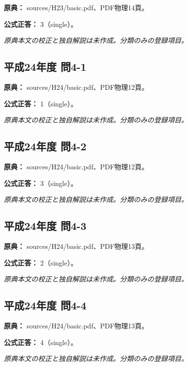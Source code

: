 \noindent\textbf{原典：} sources/H23/basic.pdf、PDF物理14頁。

\textbf{公式正答：} 3（single）。

\par\textit{原典本文の校正と独自解説は未作成。分類のみの登録項目。}

\subsection{平成24年度 問4-1}
\label{q:h24-reg-basic-4-1}

\noindent\textbf{原典：} sources/H24/basic.pdf、PDF物理12頁。

\textbf{公式正答：} 1（single）。

\par\textit{原典本文の校正と独自解説は未作成。分類のみの登録項目。}

\subsection{平成24年度 問4-2}
\label{q:h24-reg-basic-4-2}

\noindent\textbf{原典：} sources/H24/basic.pdf、PDF物理12頁。

\textbf{公式正答：} 3（single）。

\par\textit{原典本文の校正と独自解説は未作成。分類のみの登録項目。}

\subsection{平成24年度 問4-3}
\label{q:h24-reg-basic-4-3}

\noindent\textbf{原典：} sources/H24/basic.pdf、PDF物理13頁。

\textbf{公式正答：} 2（single）。

\par\textit{原典本文の校正と独自解説は未作成。分類のみの登録項目。}

\subsection{平成24年度 問4-4}
\label{q:h24-reg-basic-4-4}

\noindent\textbf{原典：} sources/H24/basic.pdf、PDF物理13頁。

\textbf{公式正答：} 4（single）。

\par\textit{原典本文の校正と独自解説は未作成。分類のみの登録項目。}

